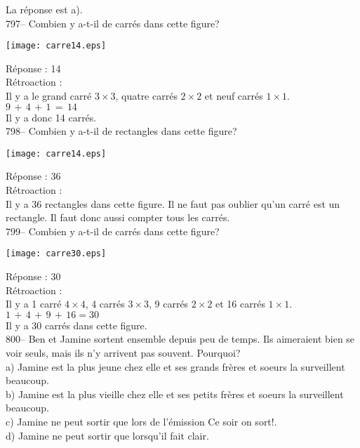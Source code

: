 ﻿\documentclass[letterpaper, 12pt]{article}
\begin{document}
La r\'eponse est a).\\

797-- Combien y a-t-il de carr\'es dans cette figure?\\
    \begin{center}
    \texttt{[image: carre14.eps]}
    \end{center}


R\'eponse : 14\\

R\'etroaction : \\
Il y a le grand carr\'e $3\times3$, quatre carr\'es $2\times2$ et neuf
carr\'es $1\times1$.\\
$9\,+\,4\,+\,1\,=\,14$\\
Il y a donc 14 carr\'es.\\

798-- Combien y a-t-il de rectangles dans cette figure?\\
    \begin{center}
    \texttt{[image: carre14.eps]}
    \end{center}

R\'eponse : 36\\

R\'etroaction : \\
Il y a 36 rectangles dans cette figure.  Il ne faut pas oublier qu'un
carr\'e est un rectangle.  Il faut donc aussi compter tous les carr\'es.  \\

799-- Combien y a-t-il de carr\'es dans cette figure?\\
    \begin{center}
    \texttt{[image: carre30.eps]}
    \end{center}

R\'eponse : 30\\

R\'etroaction : \\
Il y a 1 carr\'e $4\times4$, 4 carr\'es $3\times3$, 9 carr\'es
$2\times2$ et 16 carr\'es $1\times1$.\\
$1\,+\,4\,+\,9\,+\,16=30$\\
Il y a 30 carr\'es dans cette figure.\\

800-- Ben et Jamine sortent ensemble depuis peu de temps.  Ils aimeraient
bien se voir seuls, mais ils n'y arrivent pas souvent.  Pourquoi?\\
a) Jamine est la plus jeune chez elle et ses grands fr\`eres et soeurs la
surveillent beaucoup.\\
b) Jamine est la plus vieille chez elle et ses petits fr\`eres et soeurs la
surveillent beaucoup.\\
c) Jamine ne peut sortir que lors de l'\'emission \og Ce soir on sort!\fg .\\
d) Jamine ne peut sortir que lorsqu'il fait clair.\\
\end{document}
